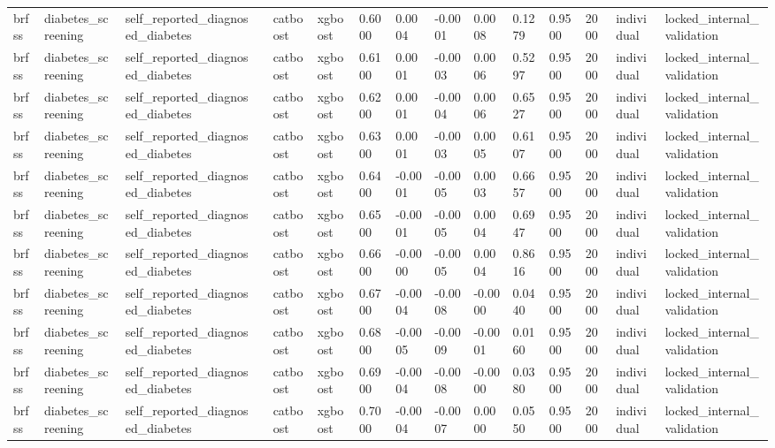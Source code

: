 \begin{tabular}{lllllllllllllll}
brfss & diabetes\_screening & self\_reported\_diagnosed\_diabetes &  & catboost & xgboost & 0.6000 & 0.0004 & -0.0001 & 0.0008 & 0.1279 & 0.9500 & 2000 & individual & locked\_internal\_validation \\
brfss & diabetes\_screening & self\_reported\_diagnosed\_diabetes &  & catboost & xgboost & 0.6100 & 0.0001 & -0.0003 & 0.0006 & 0.5297 & 0.9500 & 2000 & individual & locked\_internal\_validation \\
brfss & diabetes\_screening & self\_reported\_diagnosed\_diabetes &  & catboost & xgboost & 0.6200 & 0.0001 & -0.0004 & 0.0006 & 0.6527 & 0.9500 & 2000 & individual & locked\_internal\_validation \\
brfss & diabetes\_screening & self\_reported\_diagnosed\_diabetes &  & catboost & xgboost & 0.6300 & 0.0001 & -0.0003 & 0.0005 & 0.6107 & 0.9500 & 2000 & individual & locked\_internal\_validation \\
brfss & diabetes\_screening & self\_reported\_diagnosed\_diabetes &  & catboost & xgboost & 0.6400 & -0.0001 & -0.0005 & 0.0003 & 0.6657 & 0.9500 & 2000 & individual & locked\_internal\_validation \\
brfss & diabetes\_screening & self\_reported\_diagnosed\_diabetes &  & catboost & xgboost & 0.6500 & -0.0001 & -0.0005 & 0.0004 & 0.6947 & 0.9500 & 2000 & individual & locked\_internal\_validation \\
brfss & diabetes\_screening & self\_reported\_diagnosed\_diabetes &  & catboost & xgboost & 0.6600 & -0.0000 & -0.0005 & 0.0004 & 0.8616 & 0.9500 & 2000 & individual & locked\_internal\_validation \\
brfss & diabetes\_screening & self\_reported\_diagnosed\_diabetes &  & catboost & xgboost & 0.6700 & -0.0004 & -0.0008 & -0.0000 & 0.0440 & 0.9500 & 2000 & individual & locked\_internal\_validation \\
brfss & diabetes\_screening & self\_reported\_diagnosed\_diabetes &  & catboost & xgboost & 0.6800 & -0.0005 & -0.0009 & -0.0001 & 0.0160 & 0.9500 & 2000 & individual & locked\_internal\_validation \\
brfss & diabetes\_screening & self\_reported\_diagnosed\_diabetes &  & catboost & xgboost & 0.6900 & -0.0004 & -0.0008 & -0.0000 & 0.0380 & 0.9500 & 2000 & individual & locked\_internal\_validation \\
brfss & diabetes\_screening & self\_reported\_diagnosed\_diabetes &  & catboost & xgboost & 0.7000 & -0.0004 & -0.0007 & 0.0000 & 0.0550 & 0.9500 & 2000 & individual & locked\_internal\_validation \\

\end{tabular}
